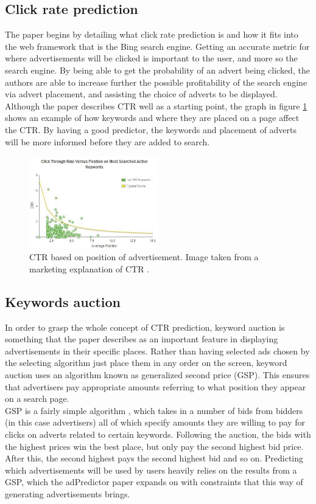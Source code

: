 \documentclass[journal]{IEEEtran}
\begin{document}
\subsection{Click rate prediction}
The paper begins by detailing what click rate prediction is and how it fits into the web framework that is the Bing search engine. Getting an accurate metric for where advertisements will be clicked is important to the user, and more so the search engine. By being able to get the probability of an advert being clicked, the authors are able to increase further the possible profitability of the search engine via advert placement, and assisting the choice of adverts to be displayed. \\
Although the paper describes CTR well as a starting point, the graph in figure \ref{fig:CTR} shows an example of how keywords and where they are placed on a page affect the CTR. By having a good predictor, the keywords and placement of adverts will be more informed before they are added to search.

\begin{figure}[!ht]
  \caption{CTR based on position of advertisement. Image taken from a marketing explanation of CTR \cite{ctr-image}.}
  \centering
  \label{fig:CTR}
    \includegraphics[width=0.5\textwidth]{CTR}
\end{figure}

\subsection{Keywords auction}
In order to grasp the whole concept of CTR prediction, keyword auction is something that the paper describes as an important feature in displaying advertisements in their specific places. Rather than having selected ads chosen by the selecting algorithm just place them in any order on the screen, keyword auction uses an algorithm known as generalized second price (GSP). This ensures that advertisers pay appropriate amounts referring to what position they appear on a search page. \\
GSP is a fairly simple algorithm \cite{keyword-auction}, which takes in a number of bids from bidders (in this case advertisers) all of which specify amounts they are willing to pay for clicks on adverts related to certain keywords. Following the auction, the bids with the highest prices win the best place, but only pay the second highest bid price. After this, the second highest pays the second highest bid and so on. Predicting which advertisements will be used by users heavily relies on the results from a GSP, which the adPredictor paper expands on with constraints that this way of generating advertisements brings.
\end{document}
